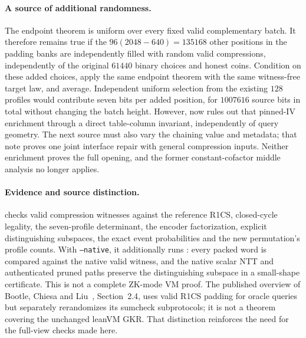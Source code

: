 \paragraph{A source of additional randomness.} The endpoint theorem is uniform over every fixed valid complementary batch. It therefore remains true if the $96(2048-640)=135168$ other positions in the padding banks are independently filled with random valid compressions, independently of the original $61440$ binary choices and honest coins. Condition on these added choices, apply the same endpoint theorem with the same witness-free target law, and average. Independent uniform selection from the existing $128$ profiles would contribute seven bits per added position, for $1007616$ source bits in total without changing the batch height. However,  now rules out that pinned-IV enrichment through a direct table-column invariant, independently of query geometry. The next source must also vary the chaining value and metadata; that note proves one joint interface repair with general compression inputs. Neither enrichment proves the full opening, and the former constant-cofactor middle analysis no longer applies.

\paragraph{Evidence and source distinction.}  checks valid compression witnesses against the reference R1CS, closed-cycle legality, the seven-profile determinant, the encoder factorization, explicit distinguishing subspaces, the exact event probabilities and the new permutation's profile counts. With \texttt{--native}, it additionally runs : every packed word is compared against the native valid witness, and the native scalar NTT and authenticated pruned paths preserve the distinguishing subspace in a small-shape certificate. This is not a complete ZK-mode VM proof. The published overview of Bootle, Chiesa and Liu~\cite{bcl}, Section~2.4, uses valid R1CS padding for oracle queries but separately rerandomizes its sumcheck subprotocols; it is not a theorem covering the unchanged leanVM GKR. That distinction reinforces the need for the full-view checks made here.
